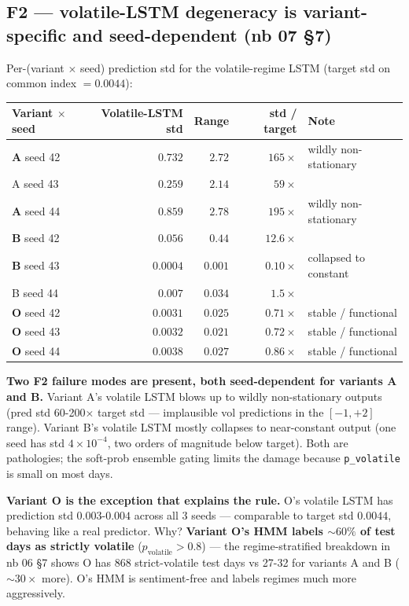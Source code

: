 \documentclass[11pt]{article}
\begin{document}
\subsection*{F2 --- volatile-LSTM degeneracy is variant-specific and seed-dependent (nb 07 \S 7)}

Per-(variant $\times$ seed) prediction std for the volatile-regime LSTM (target std on common index $= 0.0044$):

\begin{center}
\renewcommand{\arraystretch}{1.1}
\begin{tabular}{@{}lrrrl@{}}
\toprule
Variant $\times$ seed & Volatile-LSTM std & Range & std / target & Note \\
\midrule
\textbf{A} seed 42 & $\mathbf{0.732}$  & $2.72$  & $165\times$ & wildly non-stationary \\
A seed 43          & $0.259$           & $2.14$  & $59\times$  &  \\
\textbf{A} seed 44 & $\mathbf{0.859}$  & $2.78$  & $195\times$ & wildly non-stationary \\
\textbf{B} seed 42 & $0.056$           & $0.44$  & $12.6\times$ & \\
\textbf{B} seed 43 & $\mathbf{0.0004}$ & $0.001$ & $0.10\times$ & collapsed to constant \\
B seed 44          & $0.007$           & $0.034$ & $1.5\times$  &  \\
\textbf{O} seed 42 & $0.0031$          & $0.025$ & $0.71\times$ & stable / functional \\
\textbf{O} seed 43 & $0.0032$          & $0.021$ & $0.72\times$ & stable / functional \\
\textbf{O} seed 44 & $0.0038$          & $0.027$ & $0.86\times$ & stable / functional \\
\bottomrule
\end{tabular}
\end{center}

\textbf{Two F2 failure modes are present, both seed-dependent for variants A and B.} Variant A's volatile LSTM blows up to wildly non-stationary outputs (pred std 60-200$\times$ target std --- implausible vol predictions in the $[-1, +2]$ range). Variant B's volatile LSTM mostly collapses to near-constant output (one seed has std $4 \times 10^{-4}$, two orders of magnitude below target). Both are pathologies; the soft-prob ensemble gating limits the damage because \texttt{p\_volatile} is small on most days.

\textbf{Variant O is the exception that explains the rule.} O's volatile LSTM has prediction std $0.003\text{-}0.004$ across all 3 seeds --- comparable to target std $0.0044$, behaving like a real predictor. Why? \textbf{Variant O's HMM labels $\sim 60\%$ of test days as strictly volatile} ($p_{\text{volatile}} > 0.8$) --- the regime-stratified breakdown in nb 06 \S 7 shows O has 868 strict-volatile test days vs 27-32 for variants A and B ($\sim 30\times$ more). O's HMM is sentiment-free and labels regimes much more aggressively.
\end{document}
